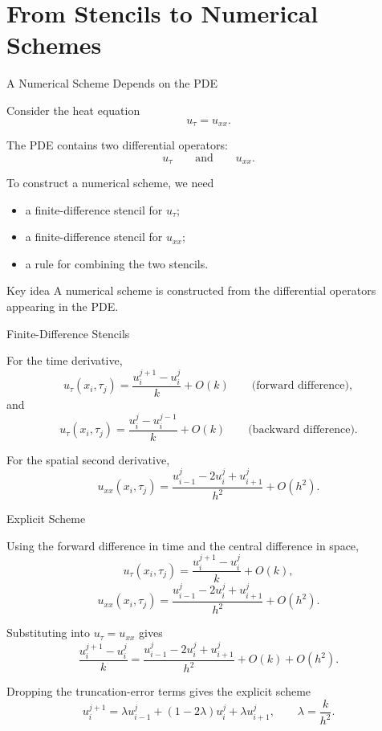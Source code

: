 \documentclass{beamer}
\begin{document}
\section[A2Q4]{From Stencils to Numerical Schemes}

\begin{frame}{A Numerical Scheme Depends on the PDE}

Consider the heat equation
\[
u_\tau=u_{xx}.
\]

The PDE contains two differential operators:
\[
u_\tau
\qquad\text{and}\qquad
u_{xx}.
\]

To construct a numerical scheme, we need

\begin{itemize}
    \item a finite-difference stencil for \(u_\tau\);
    \item a finite-difference stencil for \(u_{xx}\);
    \item a rule for combining the two stencils.
\end{itemize}

\begin{block}{Key idea}
A numerical scheme is constructed from the differential operators appearing in the PDE.
\end{block}

\end{frame}


\begin{frame}{Finite-Difference Stencils}

For the time derivative,
\[
u_\tau(x_i,\tau_j)
=
\frac{u_i^{j+1}-u_i^j}{k}
+
O(k)
\qquad
\text{(forward difference)},
\]
and
\[
u_\tau(x_i,\tau_j)
=
\frac{u_i^j-u_i^{j-1}}{k}
+
O(k)
\qquad
\text{(backward difference)}.
\]

For the spatial second derivative,
\[
u_{xx}(x_i,\tau_j)
=
\frac{
u_{i-1}^j-2u_i^j+u_{i+1}^j
}{h^2}
+
O(h^2).
\]

\end{frame}


\begin{frame}{Explicit Scheme}

Using the forward difference in time and the central difference in space,
\[
u_\tau(x_i,\tau_j)
=
\frac{u_i^{j+1}-u_i^j}{k}
+
O(k),
\]
\[
u_{xx}(x_i,\tau_j)
=
\frac{
u_{i-1}^j-2u_i^j+u_{i+1}^j
}{h^2}
+
O(h^2).
\]

Substituting into \(u_\tau=u_{xx}\) gives
\[
\frac{u_i^{j+1}-u_i^j}{k}
=
\frac{
u_{i-1}^j-2u_i^j+u_{i+1}^j
}{h^2}
+
O(k)+O(h^2).
\]

Dropping the truncation-error terms gives the explicit scheme
\[
u_i^{j+1}
=
\lambda u_{i-1}^j
+
(1-2\lambda)u_i^j
+
\lambda u_{i+1}^j,
\qquad
\lambda=\frac{k}{h^2}.
\]

\end{frame}
\end{document}
